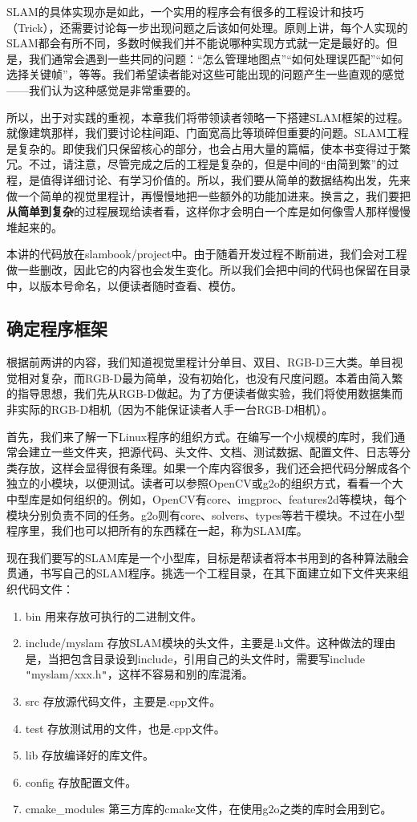 SLAM的具体实现亦是如此，一个实用的程序会有很多的工程设计和技巧（Trick），还需要讨论每一步出现问题之后该如何处理。原则上讲，每个人实现的SLAM都会有所不同，多数时候我们并不能说哪种实现方式就一定是最好的。但是，我们通常会遇到一些共同的问题：“怎么管理地图点”“如何处理误匹配”“如何选择关键帧”，等等。我们希望读者能对这些可能出现的问题产生一些直观的感觉——我们认为这种感觉是非常重要的。

\clearpage
所以，出于对实践的重视，本章我们将带领读者领略一下搭建SLAM框架的过程。就像建筑那样，我们要讨论柱间距、门面宽高比等琐碎但重要的问题。SLAM工程是复杂的。即使我们只保留核心的部分，也会占用大量的篇幅，使本书变得过于繁冗。不过，请注意，尽管完成之后的工程是复杂的，但是中间的“由简到繁”的过程，是值得详细讨论、有学习价值的。所以，我们要从简单的数据结构出发，先来做一个简单的视觉里程计，再慢慢地把一些额外的功能加进来。换言之，我们要把\textbf{从简单到复杂}的过程展现给读者看，这样你才会明白一个库是如何像雪人那样慢慢堆起来的。

本讲的代码放在slambook/project中。由于随着开发过程不断前进，我们会对工程做一些删改，因此它的内容也会发生变化。所以我们会把中间的代码也保留在目录中，以版本号命名，以便读者随时查看、模仿。

\subsection{确定程序框架}
根据前两讲的内容，我们知道视觉里程计分单目、双目、RGB-D三大类。单目视觉相对复杂，而RGB-D最为简单，没有初始化，也没有尺度问题。本着由简入繁的指导思想，我们先从RGB-D做起。为了方便读者做实验，我们将使用数据集而非实际的RGB-D相机（因为不能保证读者人手一台RGB-D相机）。

首先，我们来了解一下Linux程序的组织方式。在编写一个小规模的库时，我们通常会建立一些文件夹，把源代码、头文件、文档、测试数据、配置文件、日志等分类存放，这样会显得很有条理。如果一个库内容很多，我们还会把代码分解成各个独立的小模块，以便测试。读者可以参照OpenCV或g2o的组织方式，看看一个大中型库是如何组织的。例如，OpenCV有core、imgproc、features2d等模块，每个模块分别负责不同的任务。g2o则有core、solvers、types等若干模块。不过在小型程序里，我们也可以把所有的东西糅在一起，称为SLAM库。

现在我们要写的SLAM库是一个小型库，目标是帮读者将本书用到的各种算法融会贯通，书写自己的SLAM程序。挑选一个工程目录，在其下面建立如下文件夹来组织代码文件：

\begin{enumerate}
	\item bin	用来存放可执行的二进制文件。
	\item include/myslam	存放SLAM模块的头文件，主要是.h文件。这种做法的理由是，当把包含目录设到include，引用自己的头文件时，需要写include \texttt{"}myslam/xxx.h\texttt{"}，这样不容易和别的库混淆。
	\item src	存放源代码文件，主要是.cpp文件。
	\item test	存放测试用的文件，也是.cpp文件。
	\item lib	存放编译好的库文件。
	\item config	存放配置文件。
	\item cmake\_modules	第三方库的cmake文件，在使用g2o之类的库时会用到它。
\end{enumerate}

